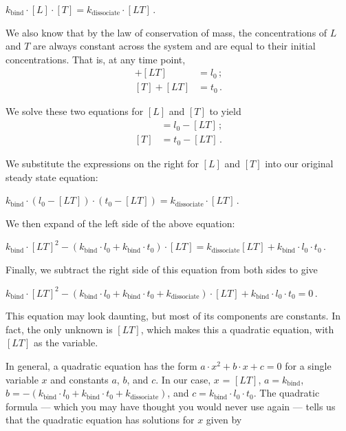 \begin{center}
$k_\text{bind} \cdot [L] \cdot [T] = k_\text{dissociate} \cdot [LT] $\,.

\end{center}

We also know that by the law of conservation of mass, the concentrations of $L$ and $T$ are always constant across the system and are equal to their initial concentrations. That is, at any time point,
\begin{align*}
[L] + [LT] & = l_0\,;\\
[T] + [LT] & = t_0\,.
\end{align*}

\noindent We solve these two equations for $[L]$ and $[T]$ to yield
\begin{align*}
[L] & = l_0 - [LT]\,;\\
[T] & = t_0 - [LT]\,.
\end{align*}

\noindent We substitute the expressions on the right for $[L]$ and $[T]$ into our original steady state equation:

\begin{center}
$k_\text{bind} \cdot (l_0 - [LT]) \cdot (t_0 - [LT]) = k_\text{dissociate} \cdot [LT]$\,.
\end{center}

\noindent We then expand of the left side of the above equation:

\begin{center}
$k_\text{bind} \cdot [LT]^2 - (k_\text{bind} \cdot l_0 + k_\text{bind} \cdot t_0) \cdot [LT]  = k_\text{dissociate} [LT] + k_\text{bind} \cdot l_0 \cdot t_0$\,.
\end{center}

\noindent Finally, we subtract the right side of this equation from both sides to give

\begin{center}
$k_\text{bind} \cdot [LT]^2 - (k_\text{bind} \cdot l_0 + k_\text{bind} \cdot t_0 + k_\text{dissociate}) \cdot [LT] + k_\text{bind} \cdot l_0 \cdot t_0 = 0$\,.
\end{center}

\noindent This equation may look daunting, but most of its components are constants. In fact, the only unknown is $[LT]$, which makes this a quadratic equation, with $[LT]$ as the variable.

In general, a quadratic equation has the form $a \cdot x^2 + b \cdot x + c = 0$ for a single variable $x$ and constants $a$, $b$, and $c$. In our case, $x$ = $[LT]$, $a = k_\text{bind}$, $b = - (k_\text{bind} \cdot l_0 + k_\text{bind} \cdot t_0 + k_\text{dissociate})$, and $c = k_\text{bind} \cdot l_0 \cdot t_0$. The quadratic formula --- which you may have thought you would never use again --- tells us that the quadratic equation has solutions for $x$ given by

